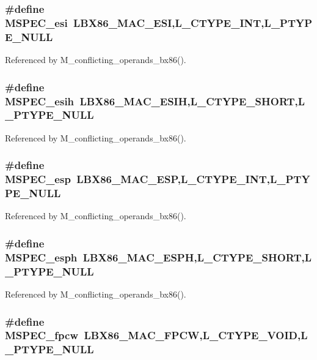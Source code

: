 \subsubsection{\setlength{\rightskip}{0pt plus 5cm}\#define MSPEC\_\-esi~LBX86\_\-MAC\_\-ESI,L\_\-CTYPE\_\-INT,L\_\-PTYPE\_\-NULL}\label{ml__bx86_8c_21603ec9fac89258c26e1af8c42b7b56}




Referenced by M\_\-conflicting\_\-operands\_\-bx86().
\subsubsection{\setlength{\rightskip}{0pt plus 5cm}\#define MSPEC\_\-esih~LBX86\_\-MAC\_\-ESIH,L\_\-CTYPE\_\-SHORT,L\_\-PTYPE\_\-NULL}\label{ml__bx86_8c_cb716c2ab4b6f941ff53f77a0348d14b}




Referenced by M\_\-conflicting\_\-operands\_\-bx86().
\subsubsection{\setlength{\rightskip}{0pt plus 5cm}\#define MSPEC\_\-esp~LBX86\_\-MAC\_\-ESP,L\_\-CTYPE\_\-INT,L\_\-PTYPE\_\-NULL}\label{ml__bx86_8c_91b25ea32581cc070e7c6ed09e1eb6bf}




Referenced by M\_\-conflicting\_\-operands\_\-bx86().
\subsubsection{\setlength{\rightskip}{0pt plus 5cm}\#define MSPEC\_\-esph~LBX86\_\-MAC\_\-ESPH,L\_\-CTYPE\_\-SHORT,L\_\-PTYPE\_\-NULL}\label{ml__bx86_8c_2390dbe88ddba711e551ef478689b145}




Referenced by M\_\-conflicting\_\-operands\_\-bx86().
\subsubsection{\setlength{\rightskip}{0pt plus 5cm}\#define MSPEC\_\-fpcw~LBX86\_\-MAC\_\-FPCW,L\_\-CTYPE\_\-VOID,L\_\-PTYPE\_\-NULL}\label{ml__bx86_8c_63331d9064097b547c59b451e99c326b}


